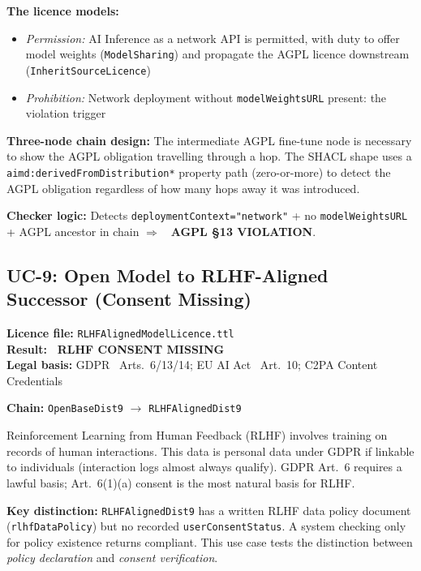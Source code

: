 \documentclass[12pt,a4paper]{article}
\newcommand{\violated}[1]{\textcolor{violation}{\textbf{\texttimes\ #1}}}
\begin{document}
\textbf{The licence models:}
\begin{itemize}[noitemsep]
  \item \emph{Permission:} AI Inference as a network API is permitted, with duty to offer model weights (\texttt{ModelSharing}) and propagate the AGPL licence downstream (\texttt{InheritSourceLicence})
  \item \emph{Prohibition:} Network deployment without \texttt{modelWeightsURL} present: the violation trigger
\end{itemize}

\textbf{Three-node chain design:} The intermediate AGPL fine-tune node is necessary to show the AGPL obligation travelling through a hop. The SHACL shape uses a \texttt{aimd:derivedFromDistribution*} property path (zero-or-more) to detect the AGPL obligation regardless of how many hops away it was introduced.

\textbf{Checker logic:} Detects \texttt{deploymentContext="network"} + no \texttt{modelWeightsURL} + AGPL ancestor in chain $\Rightarrow$ \violated{AGPL \S 13 VIOLATION}.

\subsection{UC-9: Open Model to RLHF-Aligned Successor (Consent Missing)}
\textbf{Licence file:} \texttt{RLHFAlignedModelLicence.ttl}\\[2pt]
\textbf{Result:} \violated{RLHF CONSENT MISSING}\\[4pt]
\textbf{Legal basis:} GDPR~\cite{gdpr2016} Arts.\ 6/13/14; EU AI Act~\cite{euaiact2024} Art.\ 10; C2PA Content Credentials

\textbf{Chain:} \texttt{OpenBaseDist9} $\rightarrow$ \texttt{RLHFAlignedDist9}

Reinforcement Learning from Human Feedback (RLHF) involves training on records of human interactions. This data is personal data under GDPR if linkable to individuals (interaction logs almost always qualify). GDPR Art.\ 6 requires a lawful basis; Art.\ 6(1)(a) consent is the most natural basis for RLHF.

\textbf{Key distinction:} \texttt{RLHFAlignedDist9} has a written RLHF data policy document (\texttt{rlhfDataPolicy}) but no recorded \texttt{userConsentStatus}. A system checking only for policy existence returns compliant. This use case tests the distinction between \emph{policy declaration} and \emph{consent verification}.
\end{document}
